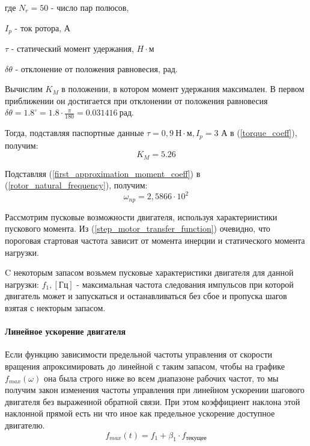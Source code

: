 где $N_{r} = 50$ - число пар полюсов,

$I_{p}$ - ток ротора, А

$\tau$ - статический момент удержания, $H \cdot \textit{м}$

$\delta\theta$ - отклонение от положения равновесия, рад.

Вычислим $K_{M}$ в положении, в котором момент удержания максимален.
В первом приближении он достигается при отклонении от положения равновесия
$\delta\theta = 1.8^{\circ} = 1.8 \cdot \frac{\pi}{180} = 0.031416 ~\textit{рад}$.

Тогда, подставляя паспортные данные $\tau = 0,9 ~\textit{Н} \cdot \textit{м}, I_{p} = 3$ А
в (\ref{torque_coeff}), получим:
\begin{equation}
    \label{first_approximation_moment_coeff}
    K_{M} = 5.26
\end{equation}

Подставляя (\ref{first_approximation_moment_coeff}) в (\ref{rotor_natural_frequency}), получим:
\begin{equation}
    \label{first_approximation_rotor_natural_frequency}
    \omega_{np} = 2,5866 \cdot 10^{2}
\end{equation}

Рассмотрим пусковые возможности двигателя, используя характериистики пускового момента. Из
(\ref{step_motor_transfer_function}) очевидно, что пороговая стартовая частота зависит от момента инерции и
статического момента нагрузки.

C некоторым запасом возьмем пусковые характеристики двигателя для данной нагрузки:
$f_{1}, [\textit{Гц}]$ - максимальная частота следования импульсов при которой двигатель может и
запускаться и останавливаться без сбое и пропуска шагов взятая с некторым запасом.

\paragraph{Линейное ускорение двигателя}
Если функцию зависимости предельной частоты управления от скорости вращения апроксимировать до
линейной с таким запасом, чтобы на графике $f_{max}( \omega )$ она была строго ниже во
всем диапазоне рабочих частот, то мы получим закон изменения частоты управления при линейном
ускорении шагового двигателя без выраженной обратной связи. При этом коэффициент наклона этой
наклонной прямой есть ни что иное как предельное ускорение доступное двигателю.
\begin{equation}
    \label{eq_synchronized_control_max_frequency}
    f_{max}(t) = f_{1} + \beta_{1} \cdot f_{\textit{текущее}}
\end{equation}


